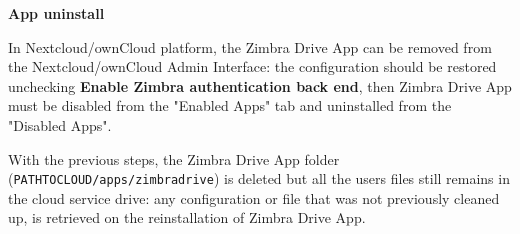     \textbf{App uninstall}

    In Nextcloud/ownCloud platform, the Zimbra Drive App can be removed from the Nextcloud/ownCloud Admin Interface:
    the configuration should be restored unchecking \textbf{Enable Zimbra authentication back end},
    then Zimbra Drive App must be disabled from the "Enabled Apps" tab and uninstalled from the "Disabled Apps".

    With the previous steps, the Zimbra Drive App folder (\texttt{PATH\textunderscore TO\textunderscore CLOUD/apps/zimbradrive})
    is deleted but all the users files still remains in the cloud service drive:
    any configuration or file that was not previously cleaned up, is retrieved on the reinstallation of Zimbra Drive App.
